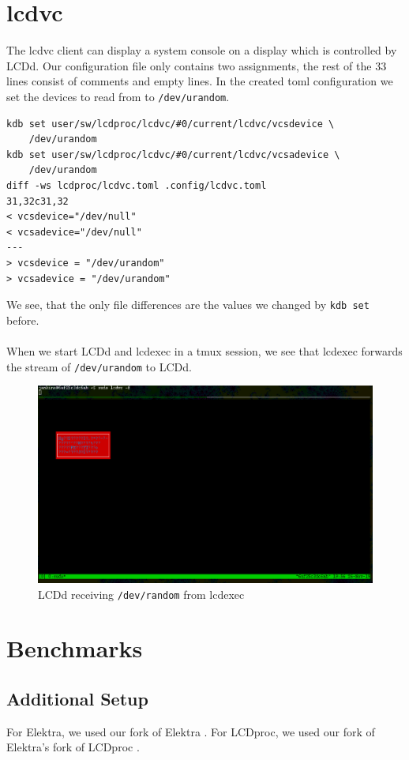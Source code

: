 \documentclass[draft,final]{vutinfth} %
\begin{document}
\section{lcdvc}
The lcdvc client can display a system console on a display which is controlled by LCDd.
Our configuration file only contains two assignments, the rest of the 33 lines consist of comments and empty lines.
In the created \acrshort{toml} configuration we set the devices to read from to \texttt{/dev/urandom}.
\begin{Verbatim}[frame=single, fontsize=\small]
kdb set user/sw/lcdproc/lcdvc/#0/current/lcdvc/vcsdevice \
    /dev/urandom
kdb set user/sw/lcdproc/lcdvc/#0/current/lcdvc/vcsadevice \
    /dev/urandom
diff -ws lcdproc/lcdvc.toml .config/lcdvc.toml
31,32c31,32
< vcsdevice="/dev/null"
< vcsadevice="/dev/null"
---
> vcsdevice = "/dev/urandom"
> vcsadevice = "/dev/urandom"
\end{Verbatim}
We see, that the only file differences are the values we changed by \texttt{kdb set} before.
\\\\
When we start LCDd and lcdexec in a \acrshort{tmux} session, we see that lcdexec forwards the stream of \texttt{/dev/urandom} to LCDd.
\FloatBarrier
\begin{figure}[h!]
	\centering
		\includegraphics[width=\linewidth]{graphics/lcdvc.png}
  \caption{LCDd receiving \texttt{/dev/random} from lcdexec}
\label{fig:lcdvc}
\end{figure}
\FloatBarrier

\section{Benchmarks}

\subsection{Additional Setup}
For Elektra, we used our fork of Elektra \cite{bauhausforkelektra}.
For LCDproc, we used our fork of Elektra's fork of LCDproc \cite{bauhausforklcdproc}.
\end{document}
